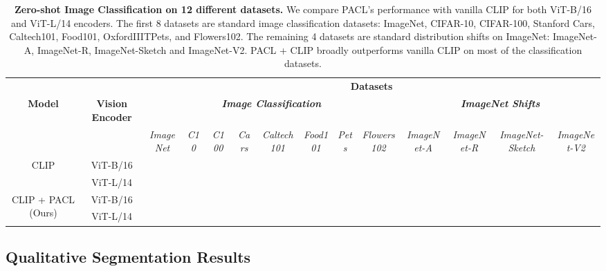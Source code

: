 \documentclass[10pt,twocolumn,letterpaper]{article}
\begin{document}
\begin{table*}[!t]
    \centering
    \scriptsize
    \resizebox{0.95\linewidth}{!}
    {
    \begin{tabular}{c|c|cccccccc|cccc}
    \toprule
    & & \multicolumn{12}{c}{\textbf{Datasets}} \\
    \textbf{Model} & \textbf{Vision Encoder} & \multicolumn{8}{c}{\textbf{\textit{Image Classification}}} & \multicolumn{4}{c}{\textbf{\textit{ImageNet Shifts}}} \\
    & & \textit{ImageNet} \cite{deng2009imagenet} & \textit{C10} \cite{krizhevsky2009learning} & \textit{C100} \cite{krizhevsky2009learning} & \textit{Cars} \cite{KrauseStarkDengFei-Fei_3DRR2013} & \textit{Caltech101} \cite{caltech101} & \textit{Food101} \cite{bossard14} & \textit{Pets} \cite{parkhi12a} & \textit{Flowers102} \cite{Nilsback08} & \textit{ImageNet-A} \cite{hendrycks2021natural} & \textit{ImageNet-R} \cite{hendrycks2021many} & \textit{ImageNet-Sketch} \cite{wang2019learning} & \textit{ImageNet-V2} \cite{recht2019imagenet} \\
    \midrule
    \multirow{2}{*}{CLIP} & ViT-B/16 &  &  &  &  &  &  &  &  &  &  &  &  \\
                          & ViT-L/14 &  &  &  &  &  &  &  &  &  &  &  &  \\
    \midrule
    \multirow{2}{*}{CLIP + PACL (Ours)} & ViT-B/16 &  &  &  &  &  &  &  &  &  &  &  &  \\
                                 & ViT-L/14 &  &  &  &  &  &  &  &  &  &  &  &  \\
    \bottomrule
    \end{tabular}
    }
    \vspace{-3mm}
    \caption{\textbf{Zero-shot Image Classification on 12 different datasets.} We compare PACL's performance with vanilla CLIP for both ViT-B/16 and ViT-L/14 encoders. The first 8 datasets are standard image classification datasets: ImageNet, CIFAR-10, CIFAR-100, Stanford Cars, Caltech101, Food101, OxfordIIITPets, and Flowers102. The remaining 4 datasets are standard distribution shifts on ImageNet: ImageNet-A, ImageNet-R, ImageNet-Sketch and ImageNet-V2. PACL + CLIP broadly outperforms vanilla CLIP on most of the classification datasets.}
    \label{table:zeroshot_image_classification}
\end{table*}

\subsection {Qualitative Segmentation Results}
\label{app:qualitative_segmentation_results}
\end{document}
